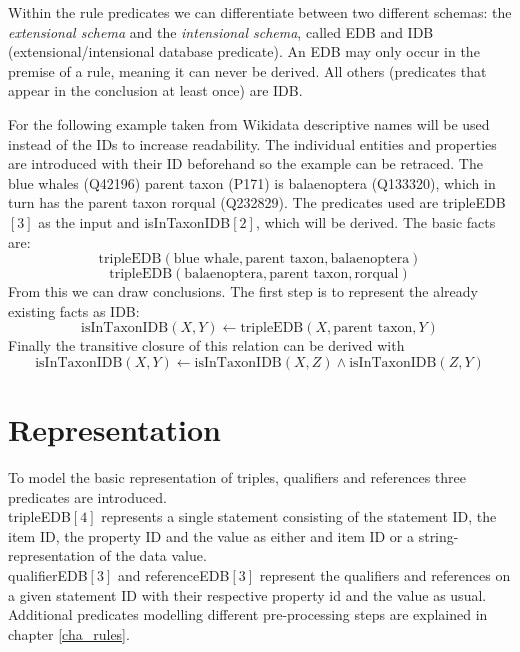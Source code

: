 \documentclass[hyperref,bachelorofscience,fleqn]{cgvpub}
\begin{document}
Within the rule predicates we can differentiate between two different schemas: the \emph{extensional schema} and the \emph{intensional schema}, called EDB and IDB  (extensional/intensional database predicate). An EDB may only occur in the premise of a rule, meaning it can never be derived. All others (predicates that appear in the conclusion at least once) are IDB.


For the following example taken from Wikidata descriptive names will be used instead of the IDs to increase readability. The individual entities and properties are introduced with their ID beforehand so the example can be retraced. The blue whales (Q42196) parent taxon (P171) is balaenoptera (Q133320), which in turn has the parent taxon rorqual (Q232829). The predicates used are tripleEDB\([3]\) as the input and isInTaxonIDB\([2]\), which will be derived. The basic facts are:\\
\[\text{tripleEDB}(\text{blue whale}, \text{parent taxon}, \text{balaenoptera})\]
\[\text{tripleEDB}(\text{balaenoptera}, \text{parent taxon}, \text{rorqual})\]
From this we can draw conclusions. The first step is to represent the already existing facts as IDB:
\[\text{isInTaxonIDB}(X, Y) \leftarrow \text{tripleEDB}(X, \text{parent taxon}, Y)\]
Finally the transitive closure of this relation can be derived with
\[\text{isInTaxonIDB}(X, Y) \leftarrow \text{isInTaxonIDB}(X, Z) \wedge \text{isInTaxonIDB}(Z, Y)\]

\section{Representation}
To model the basic representation of triples, qualifiers and references three predicates are introduced.\\
tripleEDB\([4]\) represents a single statement consisting of the statement ID, the item ID, the property ID and the value as either and item ID or a string-representation of the data value.\\
qualifierEDB\([3]\) and referenceEDB\([3]\) represent the qualifiers and references on a given statement ID with their respective property id and the value as usual.\\

Additional predicates modelling different pre-processing steps are explained in chapter \ref{cha_rules}.
\end{document}
